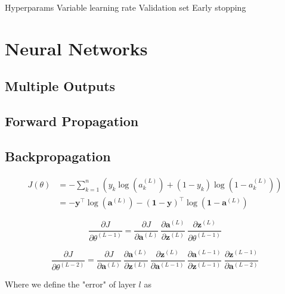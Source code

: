 \documentclass{article}[11pt]
\begin{document}
    Hyperparams
    Variable learning rate
    Validation set
    Early stopping



\section{Neural Networks}

    \subsection{Multiple Outputs}
    
    \subsection{Forward Propagation}

    \subsection{Backpropagation}
        
        
        $$ \begin{aligned}
        J(\theta)
        &= - \sum_{k=1}^{n} \left( y_k \log(a^{(L)}_k) + (1 - y_k) \log(1 - a^{(L)}_k) \right) \\
        &= -\mathbf{y}^\top \log(\mathbf{a}^{(L)}) - (\mathbf{1}-\mathbf{y})^\top \log(\mathbf{1} - \mathbf{a}^{(L)})
        \end{aligned} $$
        
        
        
        $$
        \frac{\partial J}{\partial \theta^{(L-1)}} =
            \frac{\partial J}{\partial \mathbf{a}^{(L)}} \
            \frac{\partial \mathbf{a}^{(L)}}{\partial \mathbf{z}^{(L)}} \
            \frac{\partial \mathbf{z}^{(L)}}{\partial \theta^{(L-1)}}
        $$



        $$
        \frac{\partial J}{\partial \theta^{(L-2)}} =
            \frac{\partial J}{\partial \mathbf{a}^{(L)}} \
            \frac{\partial \mathbf{a}^{(L)}}{\partial \mathbf{z}^{(L)}} \
            \frac{\partial \mathbf{z}^{(L)}}{\partial \mathbf{a}^{(L-1)}} \
            \frac{\partial \mathbf{a}^{(L-1)}}{\partial \mathbf{z}^{(L-1)}} \
            \frac{\partial \mathbf{z}^{(L-1)}}{\partial \mathbf{a}^{(L-2)}}
        $$



        Where we define the "error" of layer $l$ as
    
\end{document}
